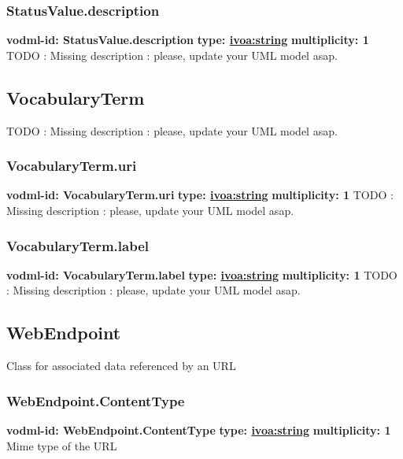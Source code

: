 {    \subsubsection{StatusValue.description}
      \textbf{vodml-id: StatusValue.description} \newline
      \textbf{type: \hyperref[sect:ivoa]{ivoa:string}} \newline
      \textbf{multiplicity: 1} \newline 
      TODO : Missing description : please, update your UML model asap.

  \subsection{VocabularyTerm}
  \label{sect:VocabularyTerm}
    TODO : Missing description : please, update your UML model asap.

    \subsubsection{VocabularyTerm.uri}
      \textbf{vodml-id: VocabularyTerm.uri} \newline
      \textbf{type: \hyperref[sect:ivoa]{ivoa:string}} \newline
      \textbf{multiplicity: 1} \newline 
      TODO : Missing description : please, update your UML model asap.

    \subsubsection{VocabularyTerm.label}
      \textbf{vodml-id: VocabularyTerm.label} \newline
      \textbf{type: \hyperref[sect:ivoa]{ivoa:string}} \newline
      \textbf{multiplicity: 1} \newline 
      TODO : Missing description : please, update your UML model asap.

  \subsection{WebEndpoint}
  \label{sect:WebEndpoint}
    Class for associated data referenced by an URL

    \subsubsection{WebEndpoint.ContentType}
      \textbf{vodml-id: WebEndpoint.ContentType} \newline
      \textbf{type: \hyperref[sect:ivoa]{ivoa:string}} \newline
      \textbf{multiplicity: 1} \newline 
      Mime type of the URL

}
